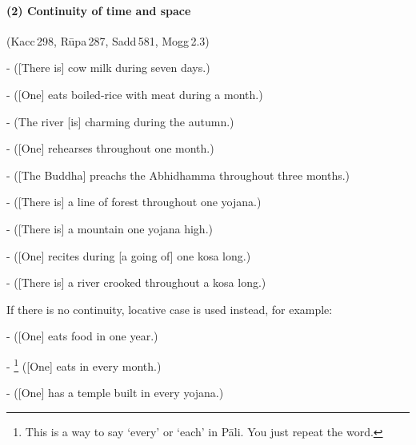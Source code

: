 \paragraph*{(2) Continuity of time and space} (Kacc\,298, R\=upa\,287, Sadd\,581, Mogg\,2.3)\par 
-  ([There is] cow milk during seven days.)\par
-  ([One] eats boiled-rice with meat during a month.)\par
-  (The river [is] charming during the autumn.)\par
-  ([One] rehearses throughout one month.)\par
-  ([The Buddha] preachs the Abhidhamma throughout three months.)\par
-  ([There is] a line of forest throughout one yojana.)\par
-  ([There is] a mountain one yojana high.)\par
-  ([One] recites during [a going of] one kosa long.)\par
-  ([There is] a river crooked throughout a kosa long.)\par
If there is no continuity, locative case is used instead, for example:\par
-  ([One] eats food in one year.)\par
- \footnote{This is a way to say `every' or `each' in P\=ali. You just repeat the word.} ([One] eats in every month.)\par
-  ([One] has a temple built in every yojana.)\par

